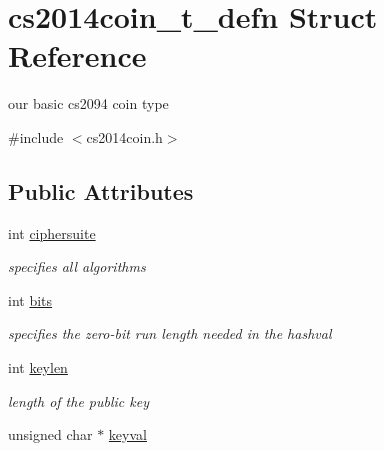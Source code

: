 \hypertarget{structcs2014coin__t__defn}{}\section{cs2014coin\+\_\+t\+\_\+defn Struct Reference}
\label{structcs2014coin__t__defn}


our basic cs2094 coin type  




{\ttfamily \#include $<$cs2014coin.\+h$>$}

\subsection*{Public Attributes}
\begin{DoxyCompactItemize}
\item 
\mbox{\label{structcs2014coin__t__defn_a0a3f3ed501a085bbc195882ce031a0af}} 
int \hyperlink{structcs2014coin__t__defn_a0a3f3ed501a085bbc195882ce031a0af}{ciphersuite}
\begin{DoxyCompactList}\small\item\em specifies all algorithms \end{DoxyCompactList}\item 
\mbox{\label{structcs2014coin__t__defn_abb73ecea0a002525acb824f17978725c}} 
int \hyperlink{structcs2014coin__t__defn_abb73ecea0a002525acb824f17978725c}{bits}
\begin{DoxyCompactList}\small\item\em specifies the zero-\/bit run length needed in the hashval \end{DoxyCompactList}\item 
\mbox{\label{structcs2014coin__t__defn_a451ffb33473c5af67e64fde5f991bdfa}} 
int \hyperlink{structcs2014coin__t__defn_a451ffb33473c5af67e64fde5f991bdfa}{keylen}
\begin{DoxyCompactList}\small\item\em length of the public key \end{DoxyCompactList}\item 
\mbox{\label{structcs2014coin__t__defn_af77bb1c315c160ac696ad26e7d4c74b4}} 
unsigned char $\ast$ \hyperlink{structcs2014coin__t__defn_af77bb1c315c160ac696ad26e7d4c74b4}{keyval}

\end{DoxyCompactItemize}
